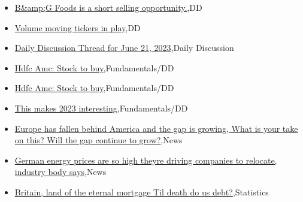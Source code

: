 \documentclass{article}%
\begin{document}
%
\begin{itemize}%
\item%
\href{https://reddit.com/r/wallstreetbets/comments/14f6slb/bg\_foods\_is\_a\_short\_selling\_opportunity/}{B\&amp;G Foods is a short selling opportunity.},DD%
\item%
\href{https://reddit.com/r/wallstreetbets/comments/14f5t0p/volume\_moving\_tickers\_in\_play/}{Volume moving tickers in play},DD%
\item%
\href{https://reddit.com/r/wallstreetbets/comments/14f3fvp/daily\_discussion\_thread\_for\_june\_21\_2023/}{Daily Discussion Thread for June 21, 2023},Daily Discussion%
\item%
\href{https://reddit.com/r/StockMarket/comments/14exhl8/hdfc\_amc\_stock\_to\_buy/}{Hdfc Amc: Stock to buy},Fundamentals/DD%
\item%
\href{https://reddit.com/r/StockMarket/comments/14ewg0h/hdfc\_amc\_stock\_to\_buy/}{Hdfc Amc: Stock to buy},Fundamentals/DD%
\item%
\href{https://reddit.com/r/StockMarket/comments/14esx8l/this\_makes\_2023\_interesting/}{This makes 2023 interesting},Fundamentals/DD%
\item%
\href{https://reddit.com/r/Economics/comments/14f4jmu/europe\_has\_fallen\_behind\_america\_and\_the\_gap\_is/}{Europe has fallen behind America and the gap is growing, What is your take on this? Will the gap continue to grow?},News%
\item%
\href{https://reddit.com/r/Economics/comments/14f1yo3/german\_energy\_prices\_are\_so\_high\_theyre\_driving/}{German energy prices are so high theyre driving companies to relocate, industry body says},News%
\item%
\href{https://reddit.com/r/Economics/comments/14enwrl/britain\_land\_of\_the\_eternal\_mortgage\_til\_death\_do/}{Britain, land of the eternal mortgage  Til death do us debt?},Statistics%
\end{itemize}%
\end{document}
